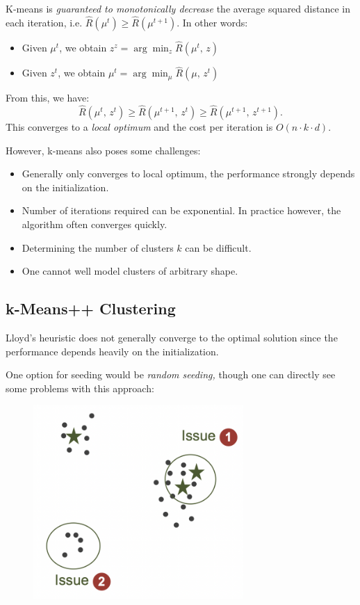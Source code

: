 \documentclass[a4paper]{extarticle}
\begin{document}
K-means is \textit{guaranteed to monotonically decrease} the average squared distance in each iteration, i.e. $\hat{R}(\mu^t) \geq \hat{R}(\mu^{t + 1})$. In other words:
\begin{itemize}
    \item Given $\mu^t$, we obtain $z^z = \arg \min_z \hat{R}(\mu^t, \, z)$
    \item Given $z^t$, we obtain $\mu^t = \arg \min_{\mu}\hat{R}(\mu, \, z^t)$
\end{itemize}
From this, we have:
\[
    \hat{R}(\mu^t, \, z^t) \geq \hat{R}(\mu^{t + 1}, \, z^t) \geq \hat{R}(\mu^{t + 1}, \, z^{t + 1}).
\]
This converges to a \textit{local optimum} and the cost per iteration is $O(n \cdot k \cdot d)$.

However, k-means also poses some challenges:
\begin{itemize}
    \item Generally only converges to local optimum, the performance strongly depends on the initialization.
    \item Number of iterations required can be exponential. In practice however, the algorithm often converges quickly.
    \item Determining the number of clusters $k$ can be difficult.
    \item One cannot well model clusters of arbitrary shape.
\end{itemize}

\subsection{k-Means++ Clustering}

Lloyd's heuristic does not generally converge to the optimal solution since the performance depends heavily on the initialization.

One option for seeding would be \textit{random seeding,} though one can directly see some problems with this approach:

\begin{figure}[H]
    \includegraphics[width=8cm]{../images/IntroML_Fig8-5}
    \centering
\end{figure}
\end{document}
